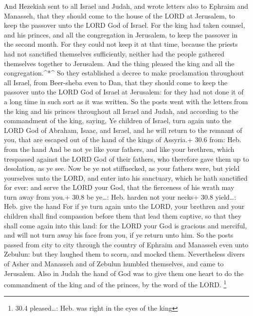  And Hezekiah sent to all Israel and Judah, and wrote
letters also to Ephraim and Manasseh, that they should come to the house
of the LORD at Jerusalem, to keep the passover unto the LORD God of
Israel.  For the king had taken counsel, and his princes,
and all the congregation in Jerusalem, to keep the passover in the
second month.  For they could not keep it at that time,
because the priests had not sanctified themselves sufficiently, neither
had the people gathered themselves together to Jerusalem. 
And the thing pleased the king and all the congregation.\^{}*\^{}
 So they established a decree to make proclamation
throughout all Israel, from Beer-sheba even to Dan, that they should
come to keep the passover unto the LORD God of Israel at Jerusalem: for
they had not done it of a long time in such sort as it was written.
 So the posts went with the letters from the king and his
princes throughout all Israel and Judah, and according to the
commandment of the king, saying, Ye children of Israel, turn again unto
the LORD God of Abraham, Isaac, and Israel, and he will return to the
remnant of you, that are escaped out of the hand of the kings of
Assyria.+ 30.6 from: Heb. from the hand  And be not ye like
your fathers, and like your brethren, which trespassed against the LORD
God of their fathers, who therefore gave them up to desolation, as ye
see.  Now be ye not stiffnecked, as your fathers were, but
yield yourselves unto the LORD, and enter into his sanctuary, which he
hath sanctified for ever: and serve the LORD your God, that the
fierceness of his wrath may turn away from you.+ 30.8 be ye\ldots: Heb.
harden not your necks+ 30.8 yield\ldots: Heb. give the hand 
For if ye turn again unto the LORD, your brethren and your children
shall find compassion before them that lead them captive, so that they
shall come again into this land: for the LORD your God is gracious and
merciful, and will not turn away his face from you, if ye return unto
him.  So the posts passed from city to city through the
country of Ephraim and Manasseh even unto Zebulun: but they laughed them
to scorn, and mocked them.  Nevertheless divers of Asher
and Manasseh and of Zebulun humbled themselves, and came to Jerusalem.
 Also in Judah the hand of God was to give them one heart
to do the commandment of the king and of the princes, by the word of the
LORD. \footnote{30.4 pleased\ldots: Heb. was right in the eyes of the
  king}

